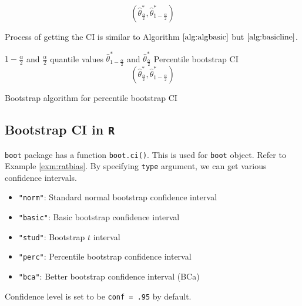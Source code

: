 \documentclass[]{book}
\providecommand{\tightlist}{%
  \setlength{\itemsep}{0pt}\setlength{\parskip}{0pt}}
\theoremstyle{definition}
\theoremstyle{definition}
\theoremstyle{definition}
\theoremstyle{remark}
\begin{document}
\[(\hat\theta_{\frac{\alpha}{2}}^{\ast}, \hat\theta_{1 - \frac{\alpha}{2}}^{\ast})\]

Process of getting the CI is similar to Algorithm \(\ref{alg:algbasic}\) but \(\ref{alg:basicline}\).

\begin{algorithm}[H] \label{alg:algperc}
  \SetAlgoLined
  $1 - \frac{\alpha}{2}$ and $\frac{\alpha}{2}$ quantile values $\hat\theta_{1 - \frac{\alpha}{2}}^{\ast}$ and $\hat\theta_{\frac{\alpha}{2}}^{\ast}$\;
  Percentile bootstrap CI $$(\hat\theta_{\frac{\alpha}{2}}^{\ast}, \hat\theta_{1 - \frac{\alpha}{2}}^{\ast})$$\;
  \caption{Bootstrap algorithm for percentile bootstrap CI}
\end{algorithm}

\hypertarget{bootstrap-ci-in-r}{%
\subsection{\texorpdfstring{Bootstrap CI in \texttt{R}}{Bootstrap CI in R}}\label{bootstrap-ci-in-r}}

\texttt{boot} package has a function \texttt{boot.ci()}. This is used for \texttt{boot} object. Refer to Example \ref{exm:ratbias}. By specifying \texttt{type} argument, we can get various confidence intervals.

\begin{itemize}
\tightlist
\item
  \texttt{"norm"}: Standard normal bootstrap confidence interval
\item
  \texttt{"basic"}: Basic bootstrap confidence interval
\item
  \texttt{"stud"}: Bootstrap \(t\) interval
\item
  \texttt{"perc"}: Percentile bootstrap confidence interval
\item
  \texttt{"bca"}: Better bootstrap confidence interval (BCa)
\end{itemize}

Confidence level is set to be \texttt{conf\ =\ .95} by default.
\end{document}
